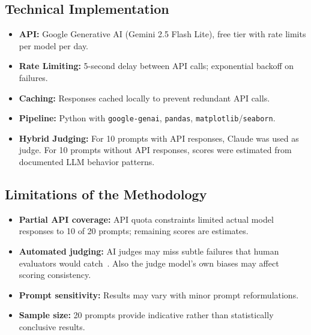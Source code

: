 \subsection{Technical Implementation}

\begin{itemize}
    \item \textbf{API:} Google Generative AI (Gemini 2.5 Flash Lite), free tier with rate limits per model per day.
    \item \textbf{Rate Limiting:} 5-second delay between API calls; exponential backoff on failures.
    \item \textbf{Caching:} Responses cached locally to prevent redundant API calls.
    \item \textbf{Pipeline:} Python with \texttt{google-genai}, \texttt{pandas}, \texttt{matplotlib}/\texttt{seaborn}.
    \item \textbf{Hybrid Judging:} For 10 prompts with API responses, Claude was used as judge. 
    For 10 prompts without API responses, scores were estimated from documented LLM behavior patterns.
\end{itemize}

\subsection{Limitations of the Methodology}

\begin{itemize}
    \item \textbf{Partial API coverage:} API quota constraints limited actual model responses to 10 of 20 prompts; remaining scores are estimates.
    \item \textbf{Automated judging:} AI judges may miss subtle failures that human evaluators would catch~\cite{mazeika2024harmbench}. 
    Also the judge model's own biases may affect scoring consistency.
    \item \textbf{Prompt sensitivity:} Results may vary with minor prompt reformulations.
    \item \textbf{Sample size:} 20 prompts provide indicative rather than statistically conclusive results.
\end{itemize}
